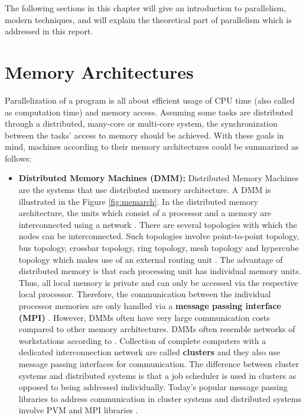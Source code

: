 The following sections in this chapter will give an introduction to parallelism, modern techniques, and will explain the theoretical part of parallelism which is addressed in this report.
\section{Memory Architectures} 
Parallelization of a program is all about efficient usage of CPU time (also called as computation time) and memory access. Assuming some tasks are distributed through a distributed, many-core or multi-core system, the synchronization between the tasks' access to memory should be achieved. With these goals in mind, machines according to their memory architectures could be summarized as follows:
\begin{itemize}
	\item \textbf{Distributed Memory Machines (DMM):} Distributed Memory Machines are the systems that use distributed memory architecture. A DMM is illustrated in the Figure \ref{fig:memarch}. In the distributed memory architecture, the units which consist of a processor and a memory are interconnected using a network \cite{springerparallel}. There are several topologies with which the nodes can be interconnected. Such topologies involve point-to-point topology, bus topology, crossbar topology, ring topology, mesh topology and hypercube topology which makes use of an external routing unit \cite{interconnection}. The advantage of distributed memory is that each processing unit has individual memory units. Thus, all local memory is private and can only be accessed via the respective local processor. Therefore, the communication between the individual processor memories are only handled via a \textbf{message passing interface (MPI)} \cite{springerparallel}. However, DMMs often have very large communication costs compared to other memory architectures. DMMs often resemble networks of workstations according to \cite{springerparallel}. Collection of complete computers with a dedicated interconnection network are called \textbf{clusters} and they also use message passing interfaces for communication. The difference between cluster systems and distributed systems is that a job scheduler is used in clusters as opposed to being addressed individually. Today's popular message passing libraries to address communication in cluster systems and distributed systems involve PVM and MPI libraries \cite{springerparallel}. 

\end{itemize}
